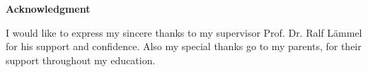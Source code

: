 \thispagestyle{empty}
\vspace*{\fill} 
\begin{center}
\textbf{Acknowledgment}
\end{center}
I would like to express my sincere thanks to my supervisor Prof. Dr. Ralf Lämmel for his support and confidence.
Also my special thanks go to my parents, for their support throughout my education.
\vspace*{\fill}
